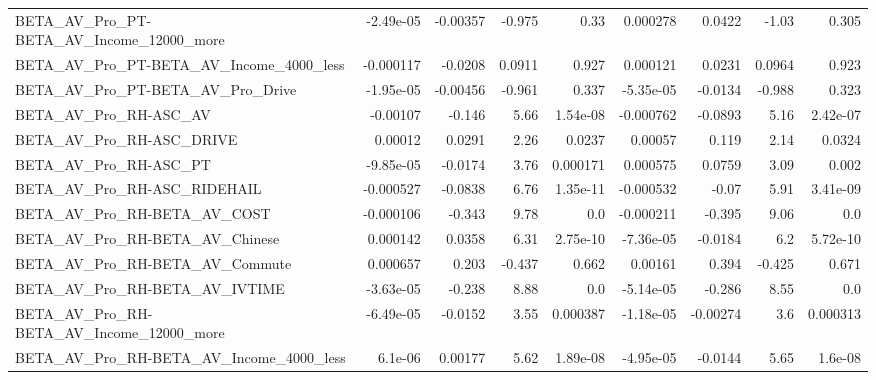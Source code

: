 \begin{tabular}{lrrrrrrrr}
BETA\_AV\_Pro\_PT-BETA\_AV\_Income\_12000\_more           &   -2.49e-05 &     -0.00357 &    -0.975 &     0.33 &   0.000278 &      0.0422 &        -1.03 &         0.305 \\
BETA\_AV\_Pro\_PT-BETA\_AV\_Income\_4000\_less            &   -0.000117 &      -0.0208 &    0.0911 &    0.927 &   0.000121 &      0.0231 &       0.0964 &         0.923 \\
BETA\_AV\_Pro\_PT-BETA\_AV\_Pro\_Drive                   &   -1.95e-05 &     -0.00456 &    -0.961 &    0.337 &  -5.35e-05 &     -0.0134 &       -0.988 &         0.323 \\
BETA\_AV\_Pro\_RH-ASC\_AV                              &    -0.00107 &       -0.146 &      5.66 & 1.54e-08 &  -0.000762 &     -0.0893 &         5.16 &      2.42e-07 \\
BETA\_AV\_Pro\_RH-ASC\_DRIVE                           &     0.00012 &       0.0291 &      2.26 &   0.0237 &    0.00057 &       0.119 &         2.14 &        0.0324 \\
BETA\_AV\_Pro\_RH-ASC\_PT                              &   -9.85e-05 &      -0.0174 &      3.76 & 0.000171 &   0.000575 &      0.0759 &         3.09 &         0.002 \\
BETA\_AV\_Pro\_RH-ASC\_RIDEHAIL                        &   -0.000527 &      -0.0838 &      6.76 & 1.35e-11 &  -0.000532 &       -0.07 &         5.91 &      3.41e-09 \\
BETA\_AV\_Pro\_RH-BETA\_AV\_COST                        &   -0.000106 &       -0.343 &      9.78 &      0.0 &  -0.000211 &      -0.395 &         9.06 &           0.0 \\
BETA\_AV\_Pro\_RH-BETA\_AV\_Chinese                     &    0.000142 &       0.0358 &      6.31 & 2.75e-10 &  -7.36e-05 &     -0.0184 &          6.2 &      5.72e-10 \\
BETA\_AV\_Pro\_RH-BETA\_AV\_Commute                     &    0.000657 &        0.203 &    -0.437 &    0.662 &    0.00161 &       0.394 &       -0.425 &         0.671 \\
BETA\_AV\_Pro\_RH-BETA\_AV\_IVTIME                      &   -3.63e-05 &       -0.238 &      8.88 &      0.0 &  -5.14e-05 &      -0.286 &         8.55 &           0.0 \\
BETA\_AV\_Pro\_RH-BETA\_AV\_Income\_12000\_more           &   -6.49e-05 &      -0.0152 &      3.55 & 0.000387 &  -1.18e-05 &    -0.00274 &          3.6 &      0.000313 \\
BETA\_AV\_Pro\_RH-BETA\_AV\_Income\_4000\_less            &     6.1e-06 &      0.00177 &      5.62 & 1.89e-08 &  -4.95e-05 &     -0.0144 &         5.65 &       1.6e-08 \\

\end{tabular}
